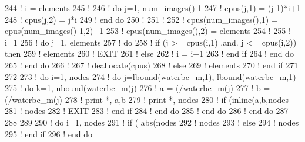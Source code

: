 \begin{DoxyCode}
{{{{{{{{{{{{{{{{244 \textcolor{comment}{!         i = elements%
245 \textcolor{comment}{!         }
246 \textcolor{comment}{!         do j=1, num\_images()-1}
247 \textcolor{comment}{!           cpus(j,1) = (j-1)*i+1}
248 \textcolor{comment}{!           cpus(j,2) = j*i}
249 \textcolor{comment}{!         end do}
250 \textcolor{comment}{!     }
251 \textcolor{comment}{!         }
252 \textcolor{comment}{!         cpus(num\_images(),1) = cpus(num\_images()-1,2)+1}
253 \textcolor{comment}{!         cpus(num\_images(),2) = elements%
254 \textcolor{comment}{!     }
255 \textcolor{comment}{!         i=1}
256 \textcolor{comment}{!         do j=1, elements%
257 \textcolor{comment}{!           do}
258 \textcolor{comment}{!             if (j >= cpus(i,1) .and. j <= cpus(i,2)) then}
259 \textcolor{comment}{!               elements%
260 \textcolor{comment}{!               EXIT}
261 \textcolor{comment}{!             else}
262 \textcolor{comment}{!               i = i+1}
263 \textcolor{comment}{!             end if}
264 \textcolor{comment}{!           end do}
265 \textcolor{comment}{!         end do}
266 \textcolor{comment}{!     }
267 \textcolor{comment}{!         deallocate(cpus)}
268 \textcolor{comment}{!       else}
269 \textcolor{comment}{!         elements%
270 \textcolor{comment}{!       end if}
271 
272     
273   \textcolor{comment}{!     do i=1, nodes%
274   \textcolor{comment}{!       do j=lbound(waterbc\_m,1), lbound(waterbc\_m,1)}
275   \textcolor{comment}{!     do k=1, ubound(waterbc\_m(j)%
276   \textcolor{comment}{!       a = (/waterbc\_m(j)%
277   \textcolor{comment}{!       b = (/waterbc\_m(j)%
278   \textcolor{comment}{!               print *, a,b}
279   \textcolor{comment}{!       print *, nodes%
280   \textcolor{comment}{!       if (inline(a,b,nodes%
281   \textcolor{comment}{!           nodes%
282   \textcolor{comment}{!           EXIT}
283   \textcolor{comment}{!       end if}
284   \textcolor{comment}{!     end do}
285   \textcolor{comment}{!       end do}
286   \textcolor{comment}{!     end do}
287                 
288               
289     
290   \textcolor{comment}{!     do i=1, nodes%
291   \textcolor{comment}{!       if ( abs(nodes%
292   \textcolor{comment}{!         nodes%
293   \textcolor{comment}{!       else}
294   \textcolor{comment}{!         nodes%
295   \textcolor{comment}{!       end if}
296   \textcolor{comment}{!     end do}
}}}}}}}}}}}}}}}}}}}}}}}}}}}}}}}}
\end{DoxyCode}
